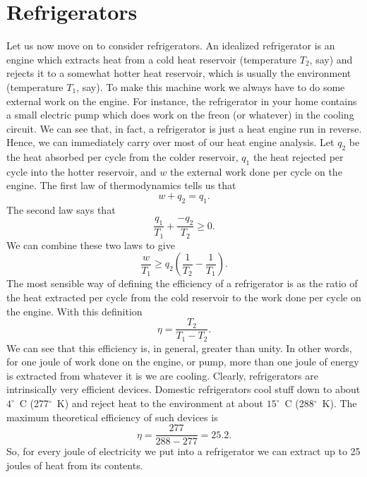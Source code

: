 \section{Refrigerators}
Let us now move on to consider refrigerators. An idealized
 refrigerator is an engine
which extracts heat from a cold heat reservoir (temperature $T_2$, say) and rejects it
to a somewhat hotter heat reservoir, which is usually the environment (temperature
$T_1$, say). To make this machine work we always have to do some external
work on the engine. For instance, the refrigerator in your home contains a small
electric pump which does work on the freon (or whatever) in the cooling
circuit. We can see that, in fact, a refrigerator is just a heat engine run
in reverse. Hence, we can immediately carry over most of our heat engine
analysis. Let $q_2$ be the heat absorbed per cycle from the colder reservoir,
$q_1$ the heat rejected per cycle into the hotter reservoir, and $w$ the 
external work done
per cycle on the engine.  The first law of thermodynamics tells us that
\begin{equation}
w + q_2 = q_1.
\end{equation}
The second law says that
\begin{equation}
\frac{q_1}{T_1} + \frac{-q_2}{T_2} \geq 0.
\end{equation}
We can combine these two laws to give
\begin{equation}
\frac{w}{T_1} \geq q_2\left(\frac{1}{T_2} - \frac{1}{T_1}\right).
\end{equation}
The most sensible way of defining the efficiency of a refrigerator is as
the ratio of the heat extracted per cycle from the cold reservoir  to
the work done per cycle on the engine. With this definition
\begin{equation}
\eta = \frac{T_2}{T_1 - T_2}.
\end{equation}
We can see that this efficiency is, in general, greater than unity. In other
words, for one joule of work done on the engine, or pump, more than one
joule of energy is extracted from whatever it is
 we are cooling. Clearly, refrigerators
are intrinsically very efficient devices. Domestic refrigerators cool stuff down
to about $4^\circ$~C (277$^\circ$~K) and reject heat to the environment
at about $15^\circ$~C (288$^\circ$~K). The maximum theoretical efficiency of
such  devices is
\begin{equation}
\eta = \frac{277}{288-277} = 25.2.
\end{equation}
So, for every joule of electricity we put into a refrigerator we can extract up
to 25 joules of heat from its contents. 

